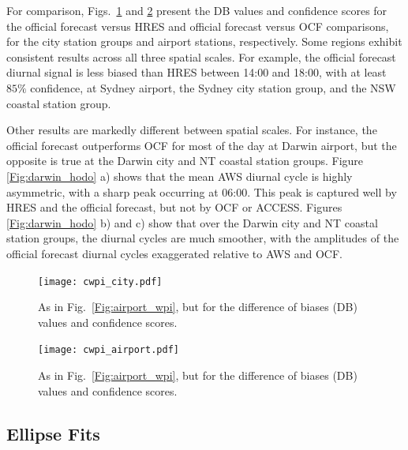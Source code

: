 \documentclass[twocol]{ametsoc}
\begin{document}
For comparison, Figs.~\ref{Fig:cwpi_city} and \ref{Fig:cwpi_airport} present the DB values and confidence scores for the official forecast versus HRES and official forecast versus OCF comparisons, for the city station groups and airport stations, respectively. Some regions exhibit consistent results across all three spatial scales. For example, the official forecast diurnal signal is less biased than HRES between 14:00 and 18:00, with at least $85\%$ confidence, at Sydney airport, the Sydney city station group, and the NSW coastal station group. 

Other results are markedly different between spatial scales. For instance, the official forecast outperforms OCF for most of the day at Darwin airport, but the opposite is true at the Darwin city and NT coastal station groups. Figure \ref{Fig:darwin_hodo} a) shows that the mean AWS diurnal cycle is highly asymmetric, with a sharp peak occurring at 06:00. This peak is captured well by HRES and the official forecast, but not by OCF or ACCESS. Figures \ref{Fig:darwin_hodo} b) and c) show that over the Darwin city and NT coastal station groups, the diurnal cycles are much smoother, with the amplitudes of the official forecast diurnal cycles exaggerated relative to AWS and OCF. 

\begin{figure}
\centering
\texttt{[image: cwpi\_city.pdf]}
\caption{As in Fig.~\ref{Fig:airport_wpi}, but for the difference of biases (DB) values and confidence scores.}
\label{Fig:cwpi_city}
\end{figure}

\begin{figure}
\centering
\texttt{[image: cwpi\_airport.pdf]}
\caption{As in Fig.~\ref{Fig:airport_wpi}, but for the difference of biases (DB) values and confidence scores.}
\label{Fig:cwpi_airport}
\end{figure}

\subsection{Ellipse Fits}
\end{document}
